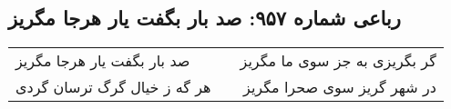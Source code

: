 \begin{center}
\section*{رباعی شماره ۹۵۷: صد بار بگفت یار هرجا مگریز}
\label{sec:0957}
\begin{longtable}{l p{0.5cm} r}
صد بار بگفت یار هرجا مگریز
&&
گر بگریزی به جز سوی ما مگریز
\\
هر گه ز خیال گرگ ترسان گردی
&&
در شهر گریز سوی صحرا مگریز
\\
\end{longtable}
\end{center}
